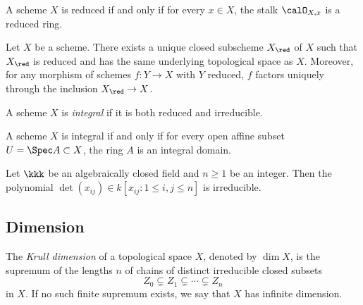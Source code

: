     \begin{proposition}\label{prop:reducedness_is_a_local_property}
        A scheme \(X\) is reduced if and only if for every \(x \in X\), the stalk \(\calO_{X,x}\) is a reduced ring.
    \end{proposition}

    \begin{proposition}\label{prop:universal_property_of_reduced_structure_on_a_scheme}
        Let \(X\) be a scheme.
        There exists a unique closed subscheme \(X_{\red}\) of \(X\) such that \(X_{\red}\) is reduced and has the same underlying topological space as \(X\).
        Moreover, for any morphism of schemes \(f : Y \to X\) with \(Y\) reduced, \(f\) factors uniquely through the inclusion \(X_{\red} \to X\).
    \end{proposition}

    \begin{definition}\label{def:integral_scheme}
        A scheme \(X\) is \emph{integral} if it is both reduced and irreducible.
    \end{definition}

    \begin{proposition}\label{prop:integral_scheme_characterization}
        A scheme \(X\) is integral if and only if for every open affine subset \(U = \Spec A \subset X\), the ring \(A\) is an integral domain.
    \end{proposition}

    \begin{corollary}\label{prop:determinant_is_irreducible_as_a_polynomial}
        Let \(\kkk\) be an algebraically closed field and \(n \geq 1\) be an integer.
        Then the polynomial \(\det(x_{ij}) \in k[x_{ij} : 1 \leq i,j \leq n]\) is irreducible.
    \end{corollary}

\subsection{Dimension}

    \begin{definition}\label{def:krull_dimension_of_topological_space}
        The \emph{Krull dimension} of a topological space \(X\), denoted by \(\dim X\), is the supremum of the lengths \(n\) of chains of distinct irreducible closed subsets
        \[ Z_0 \subsetneq Z_1 \subsetneq \cdots \subsetneq Z_n \]
        in \(X\).
        If no such finite supremum exists, we say that \(X\) has infinite dimension.
    \end{definition}

